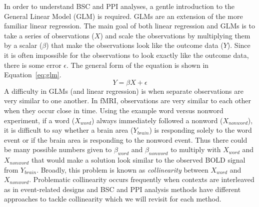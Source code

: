 \documentclass[phd,appendix,figures]{uithesis}
\begin{document}
In order to understand BSC and PPI analyses, a gentle introduction to the
General Linear Model (GLM) is required.
GLMs are an extension of the more familiar linear regression.
The main goal of both linear regression and GLMs is to take
a series of observations ($X$) and scale the observations by
multiplying them by a scalar ($\beta$) that make the observations
look like the outcome data ($Y$).
Since it is often impossible for the observations to look exactly like
the outcome data, there is some error $\epsilon$.
The general form of the equation is shown in Equation~\ref{eq:glm}.
\begin{equation}
  Y = \beta X + \epsilon
  \label{eq:glm}
\end{equation}
A difficulty in GLMs (and linear regression) is when separate observations are very similar to one another.
In fMRI, observations are very similar to each other when they occur close in time.
Using the example word versus nonword experiment, if a word ($X_{word}$) always immediately
followed a nonword ($X_{nonword}$), it is difficult to say whether
a brain area ($Y_{brain}$) is responding solely to the word event
or if the brain area is responding to the nonword event.
Thus there could be many possible numbers given to $\beta_{word}$ and $\beta_{nonword}$
to multiply with $X_{word}$ and $X_{nonword}$ that would make a solution look similar to
the observed BOLD signal from $Y_{brain}$.
Broadly, this problem is known as \textit{collinearity} between $X_{word}$ and $X_{nonword}$. 
Problematic collinearity occurs frequently when contexts are interleaved as in event-related designs and
BSC and PPI analysis methods have different approaches to tackle collinearity
which we will revisit for each method.
\end{document}
